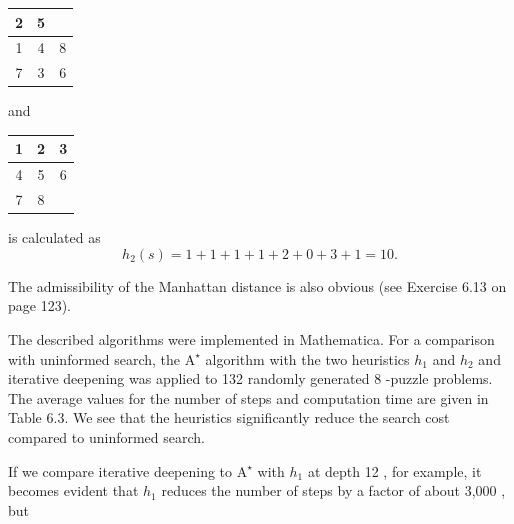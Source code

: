 \documentclass[10pt]{book}
\begin{document}
\begin{center}
\begin{tabular}{|c|c|c|}
\hline
2 & 5 &  \\
\hline
1 & 4 & 8 \\
\hline
7 & 3 & 6 \\
\hline
\end{tabular}
\hspace{1.5em}and\hspace{1.5em}
\begin{tabular}{|c|c|c|}
\hline
1 & 2 & 3 \\
\hline
4 & 5 & 6 \\
\hline
7 & 8 &  \\
\hline
\end{tabular}
\end{center}

is calculated as
$$
h_{2}(s)=1+1+1+1+2+0+3+1=10 .
$$

The admissibility of the Manhattan distance is also obvious (see Exercise 6.13 on page 123).

The described algorithms were implemented in Mathematica. For a comparison with uninformed search, the $\mathrm{A}^{\star}$ algorithm with the two heuristics $h_{1}$ and $h_{2}$ and iterative deepening was applied to 132 randomly generated 8 -puzzle problems. The average values for the number of steps and computation time are given in Table 6.3. We see that the heuristics significantly reduce the search cost compared to uninformed search.

If we compare iterative deepening to $\mathrm{A}^{\star}$ with $h_{1}$ at depth 12 , for example, it becomes evident that $h_{1}$ reduces the number of steps by a factor of about 3,000 , but
\end{document}
